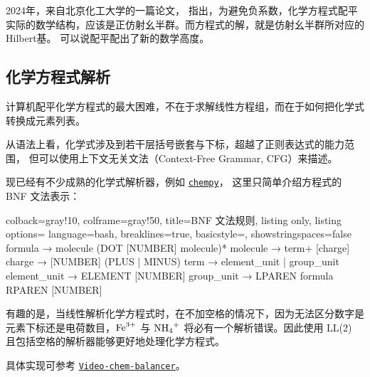 \documentclass{chem-art}
\begin{document}
2024年，来自北京化工大学的一篇论文\cite{BalancingChemicalEquations2024}，
指出，为避免负系数，化学方程式配平实际的数学结构，应该是正仿射幺半群。而方程式的解，就是仿射幺半群所对应的Hilbert基。
可以说配平配出了新的数学高度。
\subsection{化学方程式解析}

计算机配平化学方程式的最大困难，不在于求解线性方程组，而在于如何把化学式转换成元素列表。

从语法上看，化学式涉及到若干层括号嵌套与下标，超越了正则表达式的能力范围，
但可以使用上下文无关文法（Context-Free Grammar, CFG）来描述。

\vspace{0.5em}

现已经有不少成熟的化学式解析器，例如
\href{https://github.com/bjodah/chempy}{\texttt{chempy}}，
这里只简单介绍方程式的 BNF 文法表示：

\begin{tcblisting}{
        colback=gray!10,
        colframe=gray!50,
        title=BNF 文法规则,
        listing only,
        listing options={
            language=bash,
            breaklines=true,
            basicstyle=\ttfamily\small,
            showstringspaces=false
        }
    }
    formula      → molecule (DOT [NUMBER] molecule)*
    molecule     → term+ [charge]
    charge       → [NUMBER] (PLUS | MINUS)
    term         → element_unit | group_unit
    element_unit → ELEMENT [NUMBER]
    group_unit   → LPAREN formula RPAREN [NUMBER]
\end{tcblisting}

\vspace{0.5em}

有趣的是，当线性解析化学方程式时，在不加空格的情况下，因为无法区分数字是元素下标还是电荷数目，\(\ce{Fe^3+}\) 与
\(\ce{NH4+}\) 将必有一个解析错误。因此使用 LL(2) 且包括空格的解析器能够更好地处理化学方程式。

具体实现可参考
\href{https://github.com/Sazzzzzz/Video-chem-balancer}{\texttt{Video-chem-balancer}}。
\printbibliography[heading=bibintoc,title={参考文献}]
\end{document}
